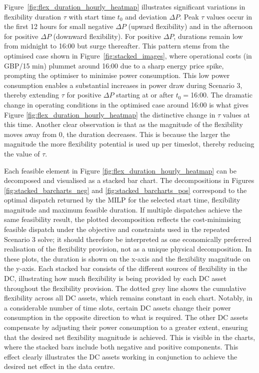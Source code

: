 \documentclass[lettersize,journal]{IEEEtran}
\newcommand{\rev}[1]{\textcolor{blue!70!black}{#1}}
\begin{document}
Figure~\ref{fig:flex_duration_hourly_heatmap} illustrates significant variations in flexibility duration $\tau$ with start time $t_0$ and deviation $\Delta P$. Peak $\tau$ values occur in the first 12 hours for small negative $\Delta P$ (upward flexibility) and in the afternoon for positive $\Delta P$ (downward flexibility). For positive $\Delta P$, durations remain low from midnight to 16:00 but surge thereafter.
This pattern stems from the optimised case shown in Figure~\ref{fig:stacked_images}, where operational costs (in GBP/15 min) plummet around 16:00 due to a sharp energy price spike, prompting the optimiser to minimise power consumption. This low power consumption enables a substantial increases in power draw during Scenario 3, thereby extending $\tau$ for positive $\Delta P$ starting at or after $t_0 = $16:00. The dramatic change in operating conditions in the optimised case around 16:00 is what gives Figure \ref{fig:flex_duration_hourly_heatmap} the distinctive change in $\tau$ values at this time. Another clear observation is that as the magnitude of the flexibility moves away from 0, the duration decreases. This is because the larger the magnitude the more flexibility potential is used up per timeslot, thereby reducing the value of $\tau$.

\rev{Each feasible element in Figure \ref{fig:flex_duration_hourly_heatmap} can be decomposed and visualised as a stacked bar chart. The decompositions in Figures \ref{fig:stacked_barcharts_neg} and \ref{fig:stacked_barcharts_pos} correspond to the optimal dispatch returned by the MILP for the selected start time, flexibility magnitude and maximum feasible duration. If multiple dispatches achieve the same feasibility result, the plotted decomposition reflects the cost-minimising feasible dispatch under the objective and constraints used in the repeated Scenario 3 solve; it should therefore be interpreted as one economically preferred realisation of the flexibility provision, not as a unique physical decomposition.} In these plots, the duration is shown on the x-axis and the flexibility magnitude on the y-axis. Each stacked bar consists of the different sources of flexibility in the DC, illustrating how much flexibility is being provided by each DC asset throughout the flexibility provision. The dotted grey line shows the cumulative flexibility across all DC assets, which remains constant in each chart. Notably, in a considerable number of time slots, certain DC assets change their power consumption in the opposite direction to what is required. The other DC assets compensate by adjusting their power consumption to a greater extent, ensuring that the desired net flexibility magnitude is achieved. This is visible in the charts, where the stacked bars include both negative and positive components. This effect clearly illustrates the DC assets working in conjunction to achieve the desired net effect in the data centre.
\end{document}
